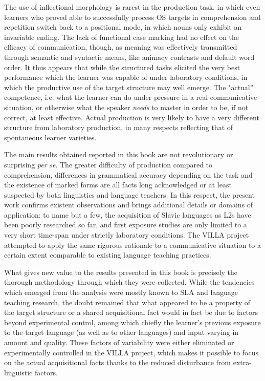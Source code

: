 The use of inflectional morphology is rarest in the production task, in which even learners who proved able to successfully process OS targets in comprehension and repetition switch back to a positional mode, in which nouns only exhibit an invariable ending. The lack of functional case marking had no effect on the efficacy of communication, though, as meaning was effectively transmitted through semantic and syntactic means, like animacy contrasts and default word order. It thus appears that while the structured tasks elicited the very best performance which the learner was capable of under laboratory conditions, in which the productive use of the target structure may well emerge. The "actual” competence, i.e. what the learner can do under pressure in a real communicative situation, or otherwise what the speaker \textit{needs} to master in order to be, if not correct, at least effective. Actual production is very likely to have a very different structure from laboratory production, in many respects reflecting that of spontaneous learner varieties.

The main results obtained reported in this book are not revolutionary or surprising \textit{per} \textit{se}. The greater difficulty of production compared to comprehension, differences in grammatical accuracy depending on the task and the existence of marked forms are all facts long acknowledged or at least suspected by both linguistics and language teachers. In this respect, the present work confirms existent observations and brings additional details or domains of application: to name but a few, the acquisition of Slavic languages as L2s have been poorly researched so far, and first exposure studies are only limited to a very short time-span under strictly laboratory conditions. The VILLA project attempted to apply the same rigorous rationale to a communicative situation to a certain extent comparable to existing language teaching practices.

What gives new value to the results presented in this book is precisely the thorough methodology through which they were collected. While the tendencies which emerged from the analysis were mostly known to SLA and language teaching research, the doubt remained that what appeared to be a property of the target structure or a shared acquisitional fact would in fact be due to factors beyond experimental control, among which chiefly the learner’s previous exposure to the target language (as well as to other languages) and input varying in amount and quality. These factors of variability were either eliminated or experimentally controlled in the VILLA project, which makes it possible to focus on the actual acquisitional facts thanks to the reduced disturbance from extra-linguistic factors.

